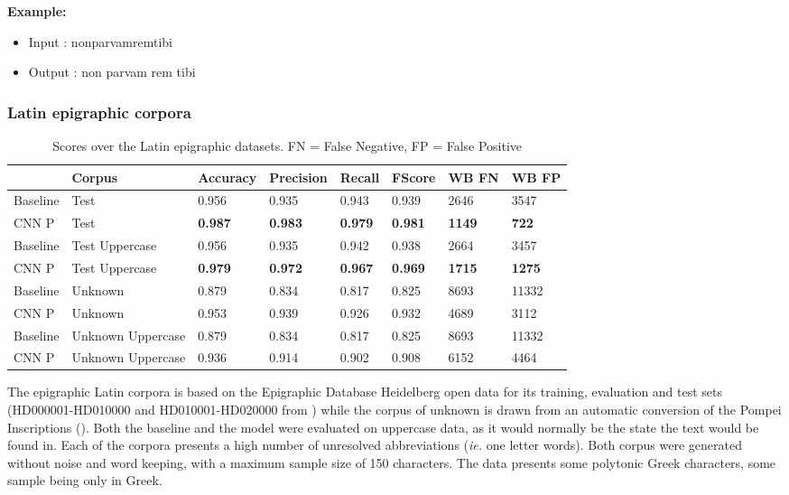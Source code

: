 \documentclass{jdmdh}
\begin{document}
\textbf{Example:}

\begin{itemize}
    \item Input : nonparvamremtibi
    \item Output : non parvam rem tibi

\end{itemize}

\subsubsection{Latin epigraphic corpora}

\begin{table}[H]
\centering
\begin{tabular}{llllllll}
\hline
 & Corpus & Accuracy & Precision & Recall & FScore & WB FN & WB FP \\ \hline
Baseline & Test & 0.956 & 0.935 & 0.943 & 0.939 & 2646 & 3547 \\
CNN P & Test & \textbf{0.987} & \textbf{0.983} & \textbf{0.979} & \textbf{0.981} & \textbf{1149} & \textbf{722} \\ \hline
Baseline & Test Uppercase & 0.956 & 0.935 & 0.942 & 0.938 & 2664 & 3457 \\
CNN P & Test Uppercase & \textbf{0.979} & \textbf{0.972} & \textbf{0.967} & \textbf{0.969} & \textbf{1715} & \textbf{1275} \\ \hline
Baseline & Unknown & 0.879 & 0.834 & 0.817 & 0.825 & 8693 & 11332 \\
CNN P & Unknown & 0.953 & 0.939 & 0.926 & 0.932 & 4689 & 3112 \\ \hline
Baseline & Unknown Uppercase & 0.879 & 0.834 & 0.817 & 0.825 & 8693 & 11332 \\
CNN P & Unknown Uppercase & 0.936 & 0.914 & 0.902 & 0.908 & 6152 & 4464 \\ \hline
\end{tabular}
\caption{Scores over the Latin epigraphic datasets. FN = False Negative, FP = False Positive}
\label{tab:epigraphyc_latin}
\end{table}


The epigraphic Latin corpora is based on the Epigraphic Database Heidelberg open data \citet{formulae} for its training, evaluation and test sets (HD000001-HD010000 and HD010001-HD020000 from \citet{edh}) while the corpus of unknown is drawn from an automatic conversion of the Pompei Inscriptions (\citet{pompei}). Both the baseline and the model were evaluated on uppercase data, as it would normally be the state the text would be found in. Each of the corpora presents a high number of unresolved abbreviations (\textit{ie.} one letter words). Both corpus were generated without noise and word keeping, with a maximum sample size of 150 characters. The data presents some polytonic Greek characters, some sample being only in Greek.
\end{document}
